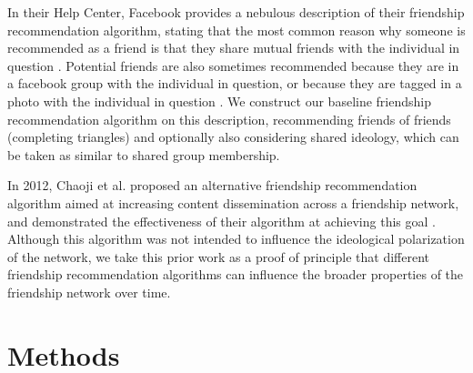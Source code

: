 \documentclass[12pt,letterpaper]{article}
\begin{document}
In their Help Center, Facebook provides a nebulous description of their friendship recommendation algorithm, stating that the most common reason why someone is recommended as a friend is that they share mutual friends with the individual in question \cite{facebook}. Potential friends are also sometimes recommended because they are in a facebook group with the individual in question, or because they are tagged in a photo with the individual in question \cite{facebook}. We construct our baseline friendship recommendation algorithm on this description, recommending friends of friends (completing triangles) and optionally also considering shared ideology, which can be taken as similar to shared group membership.

In 2012, Chaoji et al. proposed an alternative friendship recommendation algorithm aimed at increasing content dissemination across a friendship network, and demonstrated the effectiveness of their algorithm at achieving this goal \cite{chaoji}. Although this algorithm was not intended to influence the ideological polarization of the network, we take this prior work as a proof of principle that different friendship recommendation algorithms can influence the broader properties of the friendship network over time.


\section{Methods}
\end{document}
